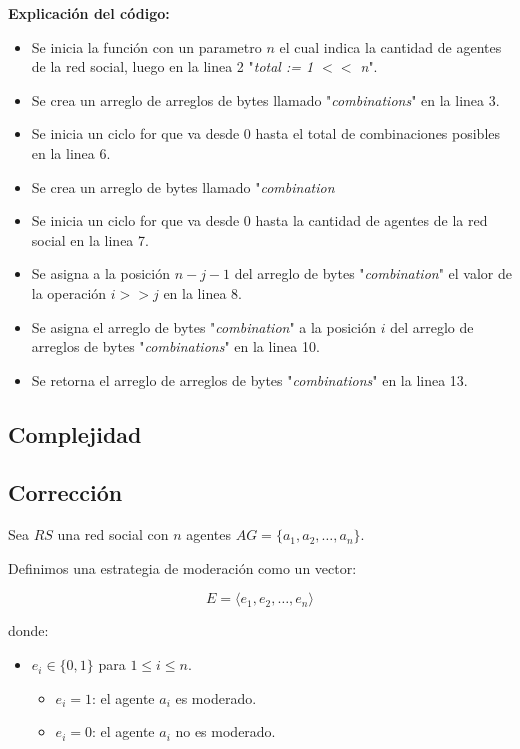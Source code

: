 \documentclass[letterpaper,10pt]{article}
\begin{document}
\textbf{Explicación del código:}
\begin{itemize}
  \item Se inicia la función con un parametro $n$ el cual indica la cantidad de agentes de la red social, luego en la linea 2 "\textit{total := 1 $<<$ n}".
  \item Se crea un arreglo de arreglos de bytes llamado "\textit{combinations}" en la linea 3.
  \item Se inicia un ciclo for que va desde 0 hasta el total de combinaciones posibles en la linea 6.
  \item Se crea un arreglo de bytes llamado "\textit{combination}
  \item Se inicia un ciclo for que va desde 0 hasta la cantidad de agentes de la red social en la linea 7.
  \item Se asigna a la posición $n-j-1$ del arreglo de bytes "\textit{combination}" el valor de la operación $i >> j$ en la linea 8.
  \item Se asigna el arreglo de bytes "\textit{combination}" a la posición $i$ del arreglo de arreglos de bytes "\textit{combinations}" en la linea 10.
  \item Se retorna el arreglo de arreglos de bytes "\textit{combinations}" en la linea 13.
\end{itemize}

\subsection{Complejidad}
\label{subsec:complejidad_fuerza_bruta}
\subsection{Corrección}
\label{subsec:correccion_fuerza_bruta}
Sea $RS$ una red social con $n$ agentes $AG = \{a_1, a_2, \dots, a_n\}$.

Definimos una estrategia de moderación como un vector:

\[
E = \langle e_1, e_2, \dots, e_n \rangle
\]

donde:
\begin{itemize}
  \item $e_i \in \{0, 1\}$ para $1 \leq i \leq n$.
  \begin{itemize}
    \item $e_i = 1$: el agente $a_i$ es moderado.
    \item $e_i = 0$: el agente $a_i$ no es moderado.
  \end{itemize}
\end{itemize}
\end{document}
